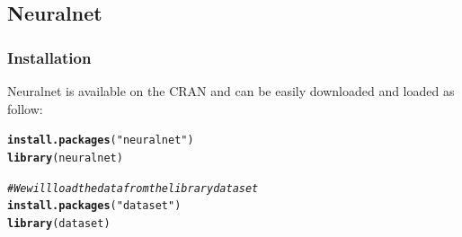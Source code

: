 \documentclass[letter]{article}\usepackage[]{graphicx}\usepackage[]{color}
\makeatletter
\newcommand{\hlstr}[1]{\textcolor[rgb]{0.192,0.494,0.8}{#1}}%
\newcommand{\hlcom}[1]{\textcolor[rgb]{0.678,0.584,0.686}{\textit{#1}}}%
\newcommand{\hlstd}[1]{\textcolor[rgb]{0.345,0.345,0.345}{#1}}%
\newcommand{\hlkwd}[1]{\textcolor[rgb]{0.737,0.353,0.396}{\textbf{#1}}}%
\newenvironment{kframe}{%
 \def\at@end@of@kframe{}%
 \ifinner\ifhmode%
  \def\at@end@of@kframe{\end{minipage}}%
  \begin{minipage}{\columnwidth}%
 \fi\fi%
 \def\FrameCommand##1{\hskip\@totalleftmargin \hskip-\fboxsep
 \colorbox{shadecolor}{##1}\hskip-\fboxsep
     \hskip-\linewidth \hskip-\@totalleftmargin \hskip\columnwidth}%
 \MakeFramed {\advance\hsize-\width
   \@totalleftmargin\z@ \linewidth\hsize
   \@setminipage}}%
 {\par\unskip\endMakeFramed%
 \at@end@of@kframe}
\newenvironment{knitrout}{}{} %
\makeatother
\begin{document}
\subsection{Neuralnet}
\subsubsection{Installation}
Neuralnet is available on the CRAN and can be easily downloaded and loaded as follow:
\begin{knitrout}
\color{fgcolor}\begin{kframe}
\begin{alltt}
\hlkwd{install.packages}\hlstd{(}\hlstr{"neuralnet"}\hlstd{)}
\hlkwd{library}\hlstd{(neuralnet)}

\hlcom{# We will load the data from the library dataset}
\hlkwd{install.packages}\hlstd{(}\hlstr{"dataset"}\hlstd{)}
\hlkwd{library}\hlstd{(dataset)}
\end{alltt}
\end{kframe}
\end{knitrout}
\end{document}
